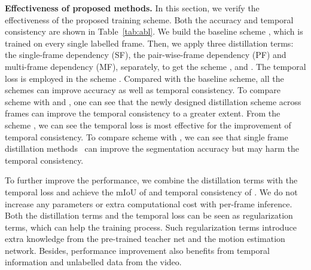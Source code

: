 \documentclass[runningheads]{llncs}
\begin{document}
\noindent\textbf{Effectiveness of proposed methods.}
In this section, we verify the effectiveness of the proposed training scheme. Both the accuracy and temporal consistency are shown in Table~\ref{tab:abl}. We build the baseline scheme , which is trained on every single labelled frame. Then, we apply three distillation
terms:
the single-frame dependency (SF),  the pair-wise-frame dependency (PF) and multi-frame dependency (MF), separately, to get the scheme ,  and . The temporal loss is employed in the scheme . Compared with the baseline scheme, all the schemes can improve accuracy as well as temporal consistency.  To compare scheme  with  and , one can see that the newly designed distillation scheme across frames can improve the temporal consistency to a greater extent. From the scheme , we can see the temporal loss is most effective for the improvement of temporal consistency. To compare scheme  with , we can see that single frame distillation methods~\cite{liu2019structured} can improve the segmentation accuracy but may harm the temporal consistency.

To further improve the performance, we combine the distillation terms with the temporal loss and achieve the mIoU of  and temporal consistency of . We do not increase any parameters or extra computational cost with per-frame inference. Both the distillation terms and the temporal loss can be seen as regularization terms, which can help the training process. Such regularization terms introduce extra knowledge from the pre-trained teacher net and the motion estimation network. Besides, performance improvement also benefits from temporal information and unlabelled data from the video.
\end{document}
